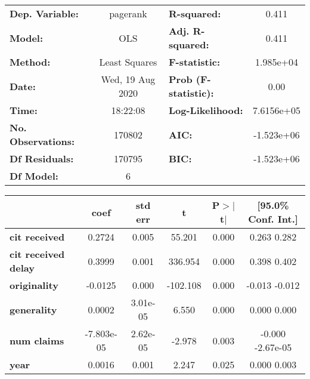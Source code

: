 \begin{center}
\begin{tabular}{lclc}
\toprule
\textbf{Dep. Variable:}     &     pagerank     & \textbf{  R-squared:         } &        0.411     \\
\textbf{Model:}             &       OLS        & \textbf{  Adj. R-squared:    } &        0.411     \\
\textbf{Method:}            &  Least Squares   & \textbf{  F-statistic:       } &    1.985e+04     \\
\textbf{Date:}              & Wed, 19 Aug 2020 & \textbf{  Prob (F-statistic):} &        0.00      \\
\textbf{Time:}              &     18:22:08     & \textbf{  Log-Likelihood:    } &    7.6156e+05    \\
\textbf{No. Observations:}  &      170802      & \textbf{  AIC:               } &    -1.523e+06    \\
\textbf{Df Residuals:}      &      170795      & \textbf{  BIC:               } &    -1.523e+06    \\
\textbf{Df Model:}          &           6      & \textbf{                     } &                  \\
\bottomrule
\end{tabular}
\begin{tabular}{lccccc}
                            & \textbf{coef} & \textbf{std err} & \textbf{t} & \textbf{P$>$$|$t$|$} & \textbf{[95.0\% Conf. Int.]}  \\
\midrule
\textbf{cit received}       &       0.2724  &        0.005     &    55.201  &         0.000        &         0.263     0.282       \\
\textbf{cit received delay} &       0.3999  &        0.001     &   336.954  &         0.000        &         0.398     0.402       \\
\textbf{originality}        &      -0.0125  &        0.000     &  -102.108  &         0.000        &        -0.013    -0.012       \\
\textbf{generality}         &       0.0002  &     3.01e-05     &     6.550  &         0.000        &         0.000     0.000       \\
\textbf{num claims}         &   -7.803e-05  &     2.62e-05     &    -2.978  &         0.003        &        -0.000 -2.67e-05       \\
\textbf{year}               &       0.0016  &        0.001     &     2.247  &         0.025        &         0.000     0.003       \\

\end{tabular}
\end{center}
